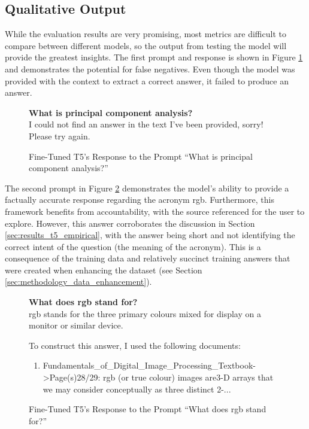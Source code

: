 \subsection{Qualitative Output}
While the evaluation results are very promising, most metrics are difficult to compare between different models, so the output from testing the model will provide the greatest insights. The first prompt and response is shown in Figure \ref{fig:results_t5_ex1} and demonstrates the potential for false negatives. Even though the model was provided with the context to extract a correct answer, it failed to produce an answer.

\begin{figure}[ht!]
    \begin{itquote}
        \textbf{What is principal component analysis?} \\
        I could not find an answer in the text I've been provided, sorry! Please try again.
    \end{itquote}
    \caption{Fine-Tuned T5's Response to the Prompt ``What is principal component analysis?''}
    \label{fig:results_t5_ex1}
\end{figure}

The second prompt in Figure \ref{fig:results_t5_ex2} demonstrates the model's ability to provide a factually accurate response regarding the acronym \acrshort{rgb}. Furthermore, this framework benefits from accountability, with the source referenced for the user to explore. However, this answer corroborates the discussion in Section \ref{sec:results_t5_empirical}, with the answer being short and not identifying the correct intent of the question (the meaning of the acronym). This is a consequence of the training data and relatively succinct training answers that were created when enhancing the dataset (see Section \ref{sec:methodology_data_enhancement}).

\begin{figure}[ht!]
    \begin{itquote}
        \textbf{What does \acrshort{rgb} stand for?} \\ 
        \acrshort{rgb} stands for the three primary colours mixed for display on a monitor or similar device.

        To construct this answer, I used the following documents:
        \begin{enumerate}
            \item Fundamentals\_of\_Digital\_Image\_Processing\_Textbook->Page(s)28/29:  \acrshort{rgb} (or true colour) images are3-D arrays that we may consider conceptually as three  distinct 2-...
        \end{enumerate}
    \end{itquote}
    \caption{Fine-Tuned T5's Response to the Prompt ``What does \acrshort{rgb} stand for?''}
    \label{fig:results_t5_ex2}
\end{figure}

